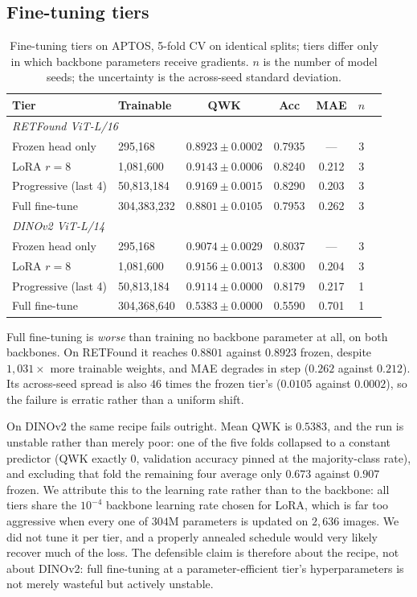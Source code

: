 \documentclass[journal]{IEEEtran}
\begin{document}
\subsection{Fine-tuning tiers}
\label{sec:finetune-results}
\begin{table}[!t]
\centering
\caption{Fine-tuning tiers on APTOS, 5-fold CV on identical splits; tiers differ only in which backbone parameters receive gradients. $n$ is the number of model seeds; the uncertainty is the across-seed standard deviation.}
\label{tab:finetune}
\begin{tabular}{llccccc}
\toprule
Tier & Trainable & QWK & Acc & MAE & $n$ \\
\midrule
\multicolumn{6}{l}{\emph{RETFound ViT-L/16}} \\
\quad Frozen head only & 295{,}168 & $0.8923 \pm 0.0002$ & 0.7935 & --- & 3 \\
\quad LoRA $r{=}8$ & 1{,}081{,}600 & $0.9143 \pm 0.0006$ & 0.8240 & 0.212 & 3 \\
\quad Progressive (last 4) & 50{,}813{,}184 & $0.9169 \pm 0.0015$ & 0.8290 & 0.203 & 3 \\
\quad Full fine-tune & 304{,}383{,}232 & $0.8801 \pm 0.0105$ & 0.7953 & 0.262 & 3 \\
\midrule
\multicolumn{6}{l}{\emph{DINOv2 ViT-L/14}} \\
\quad Frozen head only & 295{,}168 & $0.9074 \pm 0.0029$ & 0.8037 & --- & 3 \\
\quad LoRA $r{=}8$ & 1{,}081{,}600 & $0.9156 \pm 0.0013$ & 0.8300 & 0.204 & 3 \\
\quad Progressive (last 4) & 50{,}813{,}184 & $0.9114 \pm 0.0000$ & 0.8179 & 0.217 & 1 \\
\quad Full fine-tune & 304{,}368{,}640 & $0.5383 \pm 0.0000$ & 0.5590 & 0.701 & 1 \\
\bottomrule
\end{tabular}
\end{table}

Full fine-tuning is \emph{worse} than training no backbone parameter at all, on both backbones. On RETFound it reaches $0.8801$ against $0.8923$ frozen, despite $1{,}031\times$ more trainable weights, and MAE degrades in step ($0.262$ against $0.212$). Its across-seed spread is also $46$ times the frozen tier's ($0.0105$ against $0.0002$), so the failure is erratic rather than a uniform shift.

On DINOv2 the same recipe fails outright. Mean QWK is $0.5383$, and the run is unstable rather than merely poor: one of the five folds collapsed to a constant predictor (QWK exactly $0$, validation accuracy pinned at the majority-class rate), and excluding that fold the remaining four average only $0.673$ against $0.907$ frozen. We attribute this to the learning rate rather than to the backbone: all tiers share the $10^{-4}$ backbone learning rate chosen for LoRA, which is far too aggressive when every one of $304$M parameters is updated on $2{,}636$ images. We did not tune it per tier, and a properly annealed schedule would very likely recover much of the loss. The defensible claim is therefore about the recipe, not about DINOv2: full fine-tuning at a parameter-efficient tier's hyperparameters is not merely wasteful but actively unstable.
\end{document}

